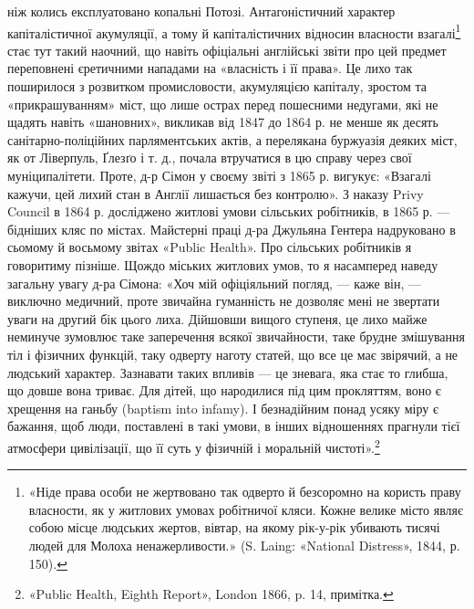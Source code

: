 \parcont{}  %
ніж колись експлуатовано копальні Потозі. Антагоністичний
характер капіталістичної акумуляції, а тому й капіталістичних
відносин власности взагалі\footnote{
«Ніде права особи не жертвовано так одверто й безсоромно на
користь праву власности, як у житлових умовах робітничої кляси. Кожне
велике місто являє собою місце людських жертов, вівтар, на якому рік-у-рік
убивають тисячі людей для Молоха ненажерливости.» (S. Laing: «National Distress», 1844, р. 150).
} стає тут такий наочний, що навіть
офіціальні англійські звіти про цей предмет переповнені єретичними
нападами на «власність і її права». Це лихо так поширилося
з розвитком промисловости, акумуляцією капіталу, зростом
та «прикрашуванням» міст, що лише острах перед пошесними
недугами, які не щадять навіть «шановних», викликав від 1847
до 1864 р. не менше як десять санітарно-поліційних парляментських
актів, а перелякана буржуазія деяких міст, як от Ліверпуль,
Ґлезґо і т. д., почала втручатися в цю справу через свої
муніципалітети. Проте, д-р Сімон у своєму звіті з 1865 р. вигукує:
«Взагалі кажучи, цей лихий стан в Англії лишається без
контролю». З наказу Privy Council в 1864 р. досліджено житлові
умови сільських робітників, в 1865 р. — бідніших кляс по містах.
Майстерні праці д-ра Джульяна Гентера надруковано в
сьомому й восьмому звітах «Public Health». Про сільських робітників
я говоритиму пізніше. Щождо міських житлових умов,
то я насамперед наведу загальну увагу д-ра Сімона: «Хоч
мій офіціяльний погляд, — каже він, — виключно медичний, проте
звичайна гуманність не дозволяє мені не звертати уваги на другий
бік цього лиха. Дійшовши вищого ступеня, це лихо майже
неминуче зумовлює таке заперечення всякої звичайности, таке
брудне змішування тіл і фізичних функцій, таку одверту наготу
статей, що все це має звірячий, а не людський характер. Зазнавати
таких впливів — це зневага, яка стає то глибша, що довше
вона триває. Для дітей, що народилися під цим прокляттям,
воно є хрещення на ганьбу (baptism into infamy). І безнадійним
понад усяку міру є бажання, щоб люди, поставлені в такі умови,
в інших відношеннях прагнули тієї атмосфери цивілізації, що її
суть у фізичній і моральній чистоті».\footnote{
«Public Health, Eighth Report», London 1866, p. 14, примітка.
}


